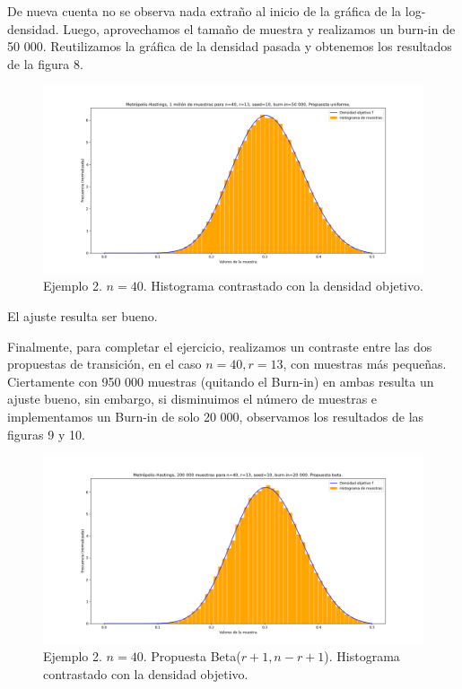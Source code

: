 \documentclass[letterpaper]{article}
\newcommand{\1}{\mathds{1}}
\theoremstyle{definition}
\theoremstyle{definition}
\theoremstyle{definition}
\theoremstyle{definition}
\theoremstyle{definition}
\begin{document}
\begin{enumerate}
\begin{itemize}
        De nueva cuenta no se observa nada extraño al inicio de la gráfica de la log-densidad. Luego, aprovechamos el tamaño de muestra y realizamos un burn-in de 50 000.
        Reutilizamos la gráfica de la densidad pasada y obtenemos los resultados de la figura 8.

        \begin{figure}[h!]
            \centering
            \includegraphics[width=\linewidth]{8.png}
            \caption{Ejemplo 2. $n=40$. Histograma contrastado con la densidad objetivo.}
        \end{figure}

        El ajuste resulta ser bueno.
    \end{itemize}
Finalmente, para completar el ejercicio, realizamos un contraste entre las dos propuestas de transición, en el caso $n=40, r=13$, con muestras más pequeñas.
Ciertamente con 950 000 muestras (quitando el Burn-in) en ambas
resulta un ajuste bueno, sin embargo, si disminuimos el número de muestras e implementamos un Burn-in de solo 20 000, observamos los resultados de las figuras 9 y 10.

\begin{figure}[h!]
    \centering
    \includegraphics[width=\linewidth]{9.png}
    \caption{Ejemplo 2. $n=40$. Propuesta Beta($r+1,n-r+1$). Histograma contrastado con la densidad objetivo.}
\end{figure}


\end{enumerate}
\end{document}
